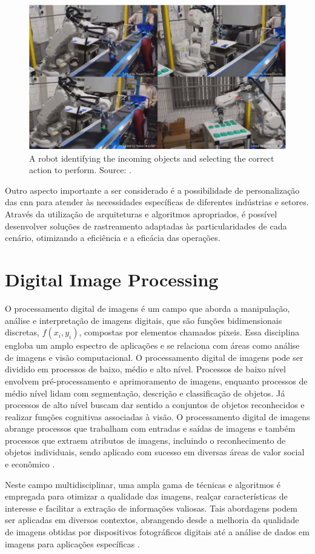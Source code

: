 \begin{figure}[h!]
\centering
\includegraphics[width=.5\linewidth]{images/Development/chap3/robots.png}
\caption{A robot identifying the incoming objects and
selecting the correct action to perform. Source: \cite{Tiwari2016}.}
\label{fig:robots}
\end{figure}

Outro aspecto importante a ser considerado é a possibilidade de personalização das \acrshort{cnn} para atender às necessidades específicas de diferentes indústrias e setores. Através da utilização de arquiteturas e algoritmos apropriados, é possível desenvolver soluções de rastreamento adaptadas às particularidades de cada cenário, otimizando a eficiência e a eficácia das operações.


\section{Digital Image Processing}\label{subsec:imageProcessing}

O processamento digital de imagens é um campo que aborda a manipulação, análise e interpretação de imagens digitais, que são funções bidimensionais discretas, $f(x_i, y_i)$, compostas por elementos chamados pixeis. Essa disciplina engloba um amplo espectro de aplicações e se relaciona com áreas como análise de imagens e visão computacional. O processamento digital de imagens pode ser dividido em processos de baixo, médio e alto nível. Processos de baixo nível envolvem pré-processamento e aprimoramento de imagens, enquanto processos de médio nível lidam com segmentação, descrição e classificação de objetos. Já processos de alto nível buscam dar sentido a conjuntos de objetos reconhecidos e realizar funções cognitivas associadas à visão. O processamento digital de imagens abrange processos que trabalham com entradas e saídas de imagens e também processos que extraem atributos de imagens, incluindo o reconhecimento de objetos individuais, sendo aplicado com sucesso em diversas áreas de valor social e econômico  \cite{gonzalez_rafael_c_digital_2018}.


Neste campo multidisciplinar, uma ampla gama de técnicas e algoritmos é empregada para otimizar a qualidade das imagens, realçar características de interesse e facilitar a extração de informações valiosas. Tais abordagens podem ser aplicadas em diversos contextos, abrangendo desde a melhoria da qualidade de imagens obtidas por dispositivos fotográficos digitais até a análise de dados em imagens para aplicações específicas \cite{ekstrom2012}. 

